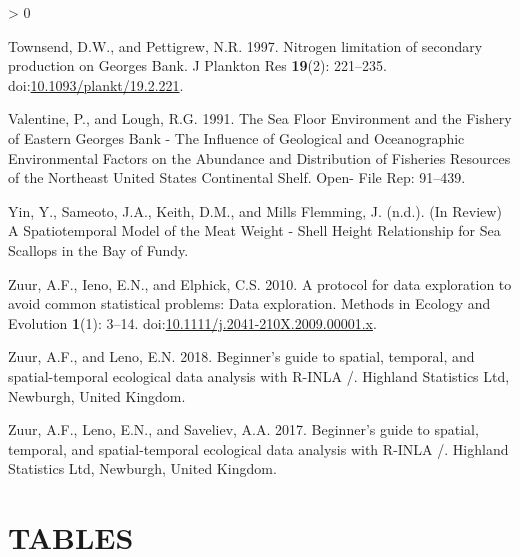 \documentclass[
]{article}
\newlength{\cslhangindent}
\newenvironment{CSLReferences}[2] %
 {%
  \setlength{\parindent}{0pt}
  \ifodd #1 \everypar{\setlength{\hangindent}{\cslhangindent}}\ignorespaces\fi
  \ifnum #2 > 0
  \setlength{\parskip}{#2\baselineskip}
  \fi
 }%
 {}
\begin{document}
\begin{CSLReferences}{1}{0}
\leavevmode\hypertarget{ref-townsendNitrogenLimitationSecondary1997}{}%
Townsend, D.W., and Pettigrew, N.R. 1997. Nitrogen limitation of secondary production on {Georges Bank}. J Plankton Res \textbf{19}(2): 221--235. doi:\href{https://doi.org/10.1093/plankt/19.2.221}{10.1093/plankt/19.2.221}.

\leavevmode\hypertarget{ref-valentineSeaFloorEnvironment1991}{}%
Valentine, P., and Lough, R.G. 1991. The {Sea Floor Environment} and the {Fishery} of {Eastern Georges Bank} - {The Influence} of {Geological} and {Oceanographic Environmental Factors} on the {Abundance} and {Distribution} of {Fisheries Resources} of the {Northeast United States Continental Shelf}. Open- File Rep: 91--439.

\leavevmode\hypertarget{ref-yinReviewSpatiotemporalModel}{}%
Yin, Y., Sameoto, J.A., Keith, D.M., and Mills Flemming, J. (n.d.). ({In Review}) {A Spatiotemporal Model} of the {Meat Weight} - {Shell Height Relationship} for {Sea Scallops} in the {Bay} of {Fundy}.

\leavevmode\hypertarget{ref-zuurProtocolDataExploration2010}{}%
Zuur, A.F., Ieno, E.N., and Elphick, C.S. 2010. A protocol for data exploration to avoid common statistical problems: {Data} exploration. Methods in Ecology and Evolution \textbf{1}(1): 3--14. doi:\href{https://doi.org/10.1111/j.2041-210X.2009.00001.x}{10.1111/j.2041-210X.2009.00001.x}.

\leavevmode\hypertarget{ref-zuurBeginnerGuideSpatial2018}{}%
Zuur, A.F., and Leno, E.N. 2018. Beginner's guide to spatial, temporal, and spatial-temporal ecological data analysis with {R}-{INLA} /. {Highland Statistics Ltd}, {Newburgh, United Kingdom}.

\leavevmode\hypertarget{ref-zuurBeginnerGuideSpatial2017}{}%
Zuur, A.F., Leno, E.N., and Saveliev, A.A. 2017. Beginner's guide to spatial, temporal, and spatial-temporal ecological data analysis with {R}-{INLA} /. {Highland Statistics Ltd}, {Newburgh, United Kingdom}.

\end{CSLReferences}

\newpage

\clearpage

\hypertarget{ref-tabs}{%
\section{TABLES}\label{ref-tabs}}
\end{document}
